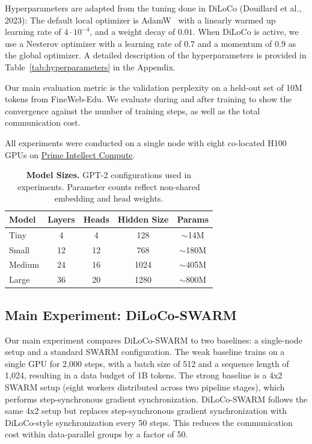 \documentclass{article}
\begin{document}
Hyperparameters are adapted from the tuning done in DiLoCo (Douillard et al., 2023): The default local optimizer is AdamW~\cite{loshchilov2019adamw} with a linearly warmed up learning rate of $4\cdot10^{-4}$, and a weight decay of $0.01$. When DiLoCo is active, we use a Nesterov optimizer
with a learning rate of $0.7$ and a momentum of $0.9$ as the global optimizer. A detailed description of the hyperparameters is provided in Table~\ref{tab:hyperparameters} in the Appendix.

Our main evaluation metric is the validation perplexity on a held-out set of 10M tokens from FineWeb-Edu. We evaluate during and after training to show the convergence against the number of training steps, as well as the total communication cost.

All experiments were conducted on a single node with eight co-located H100 GPUs
on \href{https://app.primeintellect.com/}{Prime Intellect Compute}.

\begin{table}[h]
\centering
\begin{tabular}{lcccc}
\toprule
\textbf{Model} & \textbf{Layers} & \textbf{Heads} & \textbf{Hidden Size} & \textbf{Params} \\
\midrule
Tiny & 4 & 4 & 128 & $\sim$14M \\
Small & 12 & 12 & 768 & $\sim$180M \\
Medium & 24 & 16 & 1024 & $\sim$405M \\
Large & 36 & 20 & 1280 & $\sim$800M \\
\bottomrule
\end{tabular}
\caption{\textbf{Model Sizes.} GPT-2 configurations used in experiments. Parameter counts reflect non-shared embedding and head weights.}
\label{tab:models}
\end{table}

\subsection{Main Experiment: DiLoCo-SWARM}

Our main experiment compares DiLoCo-SWARM to two baselines: a single-node setup and a standard SWARM configuration. The weak baseline trains on a single GPU for 2,000 steps, with a batch size of 512 and a sequence length of 1,024, resulting in a data budget of 1B tokens. The strong baseline is a 4x2 SWARM setup (eight workers distributed across two pipeline stages), which performs step-synchronous gradient synchronization. DiLoCo-SWARM follows the same 4x2 setup but replaces step-synchronous gradient synchronization with DiLoCo-style synchronization every 50 steps. This reduces the communication cost within data-parallel groups by a factor of 50.
\end{document}
